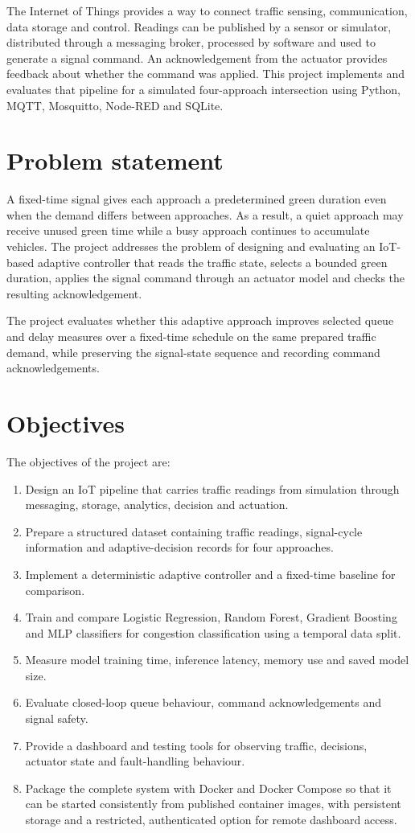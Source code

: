 \documentclass[12pt,a4paper,oneside]{report}
\begin{document}
The Internet of Things provides a way to connect traffic sensing, communication, data storage and control. Readings can be published by a sensor or simulator, distributed through a messaging broker, processed by software and used to generate a signal command. An acknowledgement from the actuator provides feedback about whether the command was applied. This project implements and evaluates that pipeline for a simulated four-approach intersection using Python, MQTT, Mosquitto, Node-RED and SQLite.

\section{Problem statement}
A fixed-time signal gives each approach a predetermined green duration even when the demand differs between approaches. As a result, a quiet approach may receive unused green time while a busy approach continues to accumulate vehicles. The project addresses the problem of designing and evaluating an IoT-based adaptive controller that reads the traffic state, selects a bounded green duration, applies the signal command through an actuator model and checks the resulting acknowledgement.

The project evaluates whether this adaptive approach improves selected queue and delay measures over a fixed-time schedule on the same prepared traffic demand, while preserving the signal-state sequence and recording command acknowledgements.

\section{Objectives}
The objectives of the project are:
\begin{enumerate}
  \item Design an IoT pipeline that carries traffic readings from simulation through messaging, storage, analytics, decision and actuation.
  \item Prepare a structured dataset containing traffic readings, signal-cycle information and adaptive-decision records for four approaches.
  \item Implement a deterministic adaptive controller and a fixed-time baseline for comparison.
  \item Train and compare Logistic Regression, Random Forest, Gradient Boosting and MLP classifiers for congestion classification using a temporal data split.
  \item Measure model training time, inference latency, memory use and saved model size.
  \item Evaluate closed-loop queue behaviour, command acknowledgements and signal safety.
  \item Provide a dashboard and testing tools for observing traffic, decisions, actuator state and fault-handling behaviour.
  \item Package the complete system with Docker and Docker Compose so that it can be started consistently from published container images, with persistent storage and a restricted, authenticated option for remote dashboard access.
\end{enumerate}
\end{document}

